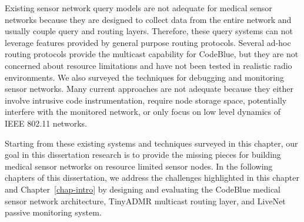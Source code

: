 Existing sensor network query models are not
adequate for medical sensor networks because they are designed to collect data
from the entire network and usually couple query and routing layers.
Therefore, these query systems can not leverage features provided by general
purpose routing protocols. Several ad-hoc routing protocols provide the
multicast capability for CodeBlue, but they are not concerned about resource
limitations and have not been tested in realistic radio environments. 
We also surveyed the techniques for debugging and monitoring sensor networks.
Many current approaches are not adequate because they either involve intrusive code
instrumentation, require node storage space, potentially interfere with the
monitored network, or only focus on low level dynamics of IEEE 802.11 networks. 

Starting from these existing systems and techniques surveyed in this chapter,
our goal in this dissertation research is to provide the missing pieces for
building medical sensor networks on resource limited sensor nodes. In the
following chapters of this dissertation, we address the challenges highlighted
in this chapter and Chapter~\ref{chap-intro} by designing and evaluating the
CodeBlue medical sensor network architecture, TinyADMR multicast routing
layer, and LiveNet passive monitoring system.
